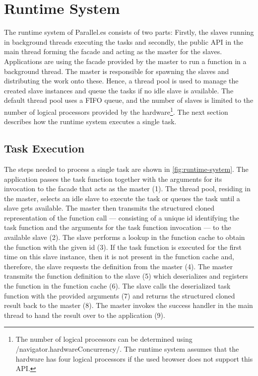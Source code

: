 \section{Runtime System}\label{sec:runtime-system}
The runtime system of Parallel.es consists of two parts: Firstly, the slaves running in background threads executing the tasks and secondly, the public API in the main thread forming the facade and acting as the master for the slaves. Applications are using the facade provided by the master to run a function in a background thread. The master is responsible for spawning the slaves and distributing the work onto these. Hence, a thread pool is used to manage the created slave instances and queue the tasks if no idle slave is available. The default thread pool uses a FIFO queue, and the number of slaves is limited to the number of logical processors provided by the hardware\footnote{The number of logical processors can be determined using \javascriptinline/navigator.hardwareConcurrency/. The runtime system assumes that the hardware has four logical processors if the used browser does not support this API.}. The next section describes how the runtime system executes a single task. 

\subsection{Task Execution}
The steps needed to process a single task are shown in \cref{fig:runtime-system}. The application passes the task function together with the arguments for its invocation to the facade that acts as the master (1). The thread pool, residing in the master, selects an idle slave to execute the task or queues the task until a slave gets available. The master then transmits the structured cloned representation of the function call --- consisting of a unique id identifying the task function and the arguments for the task function invocation --- to the available slave (2). The slave performs a lookup in the function cache to obtain the function with the given id (3). If the task function is executed for the first time on this slave instance, then it is not present in the function cache and, therefore, the slave requests the definition from the master (4). The master transmits the function definition to the slave (5) which deserializes and registers the function in the function cache (6). The slave calls the deserialized task function with the provided arguments (7) and returns the structured cloned result back to the master (8). The master invokes the success handler in the main thread to hand the result over to the application (9). 

